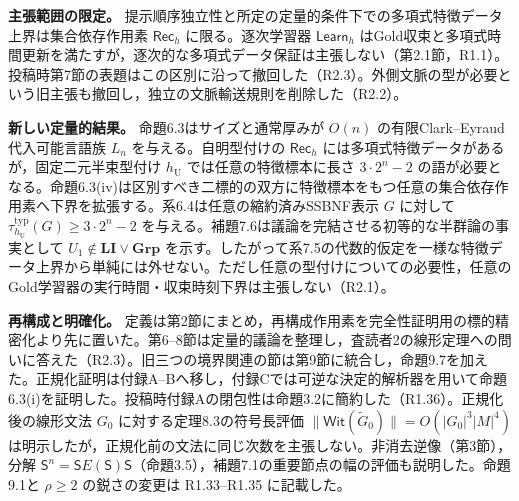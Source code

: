 \documentclass[10pt,a4paper]{ltjsarticle}
\newcommand{\Bh}{\mathsf{Rec}_h}
\newcommand{\Ah}{\mathsf{Learn}_h}
\begin{document}
\noindent\textbf{主張範囲の限定。}
提示順序独立性と所定の定量的条件下での多項式特徴データ上界は集合依存作用素 $\Bh$ に限る。逐次学習器 $\Ah$ はGold収束と多項式時間更新を満たすが，逐次的な多項式データ保証は主張しない（第2.1節，R1.1）。投稿時第7節の表題はこの区別に沿って撤回した（R2.3）。外側文脈の型が必要という旧主張も撤回し，独立の文脈輸送規則を削除した（R2.2）。

\noindent\textbf{新しい定量的結果。}
命題6.3はサイズと通常厚みが $O(n)$ の有限Clark--Eyraud代入可能言語族 $L_n$ を与える。自明型付けの $\Bh$ には多項式特徴データがあるが，固定二元半束型付け $h_{\mathrm U}$ では任意の特徴標本に長さ $3\cdot2^n-2$ の語が必要となる。命題6.3(iv)は区別すべき二標的の双方に特徴標本をもつ任意の集合依存作用素へ下界を拡張する。系6.4は任意の縮約済みSSBNF表示 $G$ に対して $\tau_{h_{\mathrm U}}^{\mathrm{typ}}(G)\ge3\cdot2^n-2$ を与える。補題7.6は議論を完結させる初等的な半群論の事実として $U_1\notin\mathbf{LI}\vee\mathbf{Grp}$ を示す。したがって系7.5の代数的仮定を一様な特徴データ上界から単純には外せない。ただし任意の型付けについての必要性，任意のGold学習器の実行時間・収束時刻下界は主張しない（R2.1）。

\noindent\textbf{再構成と明確化。}
定義は第2節にまとめ，再構成作用素を完全性証明用の標的精密化より先に置いた。第6--8節は定量的議論を整理し，査読者2の線形定理への問いに答えた（R2.3）。旧三つの境界関連の節は第9節に統合し，命題9.7を加えた。正規化証明は付録A--Bへ移し，付録Cでは可逆な決定的解析器を用いて命題6.3(i)を証明した。投稿時付録Aの閉包性は命題3.2に簡約した（R1.36）。正規化後の線形文法 $G_0$ に対する定理8.3の符号長評価 $\|\mathsf{Wit}(\widetilde G_0)\|=O(|G_0|^3|M|^4)$ は明示したが，正規化前の文法に同じ次数を主張しない。非消去逆像（第3節），分解 $\mathsf{S}^n=\mathsf{S}E(\mathsf{S})\mathsf{S}$（命題3.5），補題7.1の重要節点の幅の評価も説明した。命題9.1と $\rho\ge2$ の鋭さの変更は R1.33--R1.35 に記載した。
\end{document}
